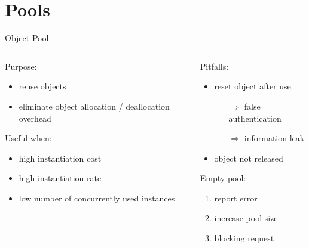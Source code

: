 \documentclass{beamer}
\begin{document}
\section{Pools}
\begin{frame}{Object Pool}
\begin{columns}
  \begin{column}{.47\textwidth}

    \begin{block}{Purpose:}
      \begin{itemize}
        \item reuse objects
        \item eliminate object allocation / deallocation overhead
      \end{itemize}
    \end{block}

    \pause

    \begin{block}{Useful when:}
      \begin{itemize}
        \item high instantiation cost
        \item high instantiation rate
        \item low number of concurrently used instances
      \end{itemize}
    \end{block}
  \end{column}

  \pause

  \begin{column}{.47\textwidth}
    \begin{block}{Pitfalls:}
      \begin{itemize}
        \item reset object after use
          \begin{itemize}
            \item[$\Rightarrow$] false authentication
            \item[$\Rightarrow$] information leak
          \end{itemize}
        \item object not released
      \end{itemize}
    \end{block}

    \pause

    \begin{block}{Empty pool:}
      \begin{enumerate}
        \item report error
        \item increase pool size
        \item blocking request
      \end{enumerate}
    \end{block}
  \end{column}
\end{columns}


\end{frame}
\end{document}
